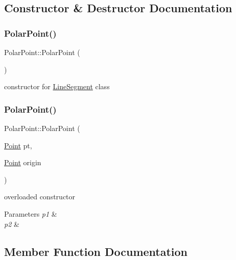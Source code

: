 \subsection{Constructor \& Destructor Documentation}
\mbox{\label{classPolarPoint_aa5dc669fa33f48c9dccd235751cb8db5}} 
\subsubsection{\texorpdfstring{Polar\+Point()}{PolarPoint()}\hspace{0.1cm}{\footnotesize\ttfamily [1/2]}}
{\footnotesize\ttfamily Polar\+Point\+::\+Polar\+Point (\begin{DoxyParamCaption}{ }\end{DoxyParamCaption})}

constructor for \hyperlink{classLineSegment}{Line\+Segment} class \mbox{\label{classPolarPoint_a85656b69c29c9f60781dd734926863b6}} 
\subsubsection{\texorpdfstring{Polar\+Point()}{PolarPoint()}\hspace{0.1cm}{\footnotesize\ttfamily [2/2]}}
{\footnotesize\ttfamily Polar\+Point\+::\+Polar\+Point (\begin{DoxyParamCaption}\item[{\hyperlink{classPoint}{Point}}]{pt,  }\item[{\hyperlink{classPoint}{Point}}]{origin }\end{DoxyParamCaption})}

overloaded constructor 
\begin{DoxyParams}{Parameters}
{\em p1} & \\
\hline
{\em p2} & \\
\hline
\end{DoxyParams}


\subsection{Member Function Documentation}
\mbox{\label{classPolarPoint_a5918f355697069f0e54e924673c7a872}} 
